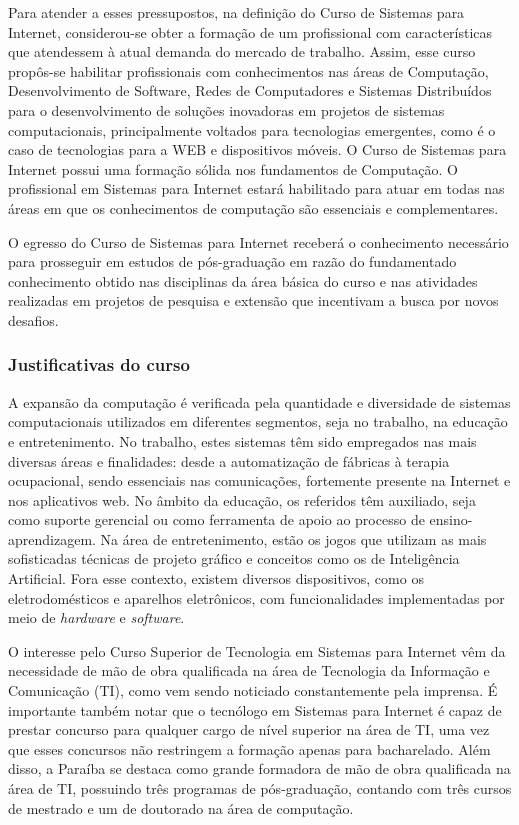 Para atender a esses pressupostos, na definição do Curso de Sistemas para Internet, considerou-se obter a formação de um profissional com características que atendessem à atual demanda do mercado de trabalho. Assim, esse curso propôs-se habilitar profissionais com conhecimentos nas áreas de Computação, Desenvolvimento de Software, Redes de Computadores e Sistemas Distribu\'idos para o desenvolvimento de soluções inovadoras em projetos de sistemas computacionais, principalmente voltados para tecnologias emergentes, como \'e o caso de tecnologias para a WEB e dispositivos m\'oveis. O Curso de Sistemas para Internet possui uma formação sólida nos fundamentos de Computação. O profissional em Sistemas para Internet estará habilitado para atuar em todas nas áreas em que os conhecimentos de computação são essenciais e complementares.  

O egresso do Curso de Sistemas para Internet receberá o conhecimento necessário para prosseguir em estudos de pós-graduação em razão do fundamentado conhecimento obtido nas disciplinas da área básica do curso e nas atividades realizadas em projetos de pesquisa e extensão que incentivam a busca por novos desafios.

\subsubsection{Justificativas do curso}

A expansão da computação é verificada pela quantidade e diversidade de sistemas computacionais utilizados em diferentes segmentos, seja no trabalho, na educação e entretenimento. No trabalho, estes sistemas têm sido empregados nas mais diversas áreas e finalidades: desde a automatização de fábricas à terapia ocupacional, sendo essenciais nas comunicações, fortemente presente na Internet e nos aplicativos web. No âmbito da educação, os referidos têm auxiliado, seja como suporte gerencial ou como ferramenta de apoio ao processo de ensino-aprendizagem. Na área de entretenimento, estão os jogos que utilizam as mais sofisticadas técnicas de projeto gráfico e conceitos como os de Inteligência Artificial. Fora esse contexto, existem diversos dispositivos, como os eletrodomésticos e aparelhos eletrônicos, com funcionalidades implementadas por meio de \textit{hardware} e \textit{software}.


O interesse pelo Curso Superior de Tecnologia em Sistemas para Internet vêm da necessidade de mão de obra qualificada na área de Tecnologia da Informação e Comunicação (TI), como vem sendo noticiado constantemente pela imprensa. É importante também notar que o tecnólogo em Sistemas para Internet é capaz de prestar concurso para qualquer cargo de nível superior na área de TI, uma vez que esses concursos não restringem a formação apenas para bacharelado. Além disso, a Paraíba se destaca como grande formadora de mão de obra qualificada na área de TI, possuindo três programas de pós-graduação, contando com três cursos de mestrado e um de doutorado na área de computação.%

